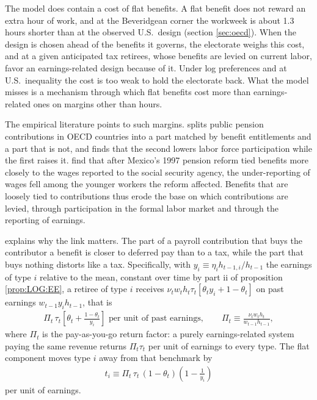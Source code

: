 The model does contain a cost of flat benefits. A flat benefit does not reward an extra hour of work, and at the Beveridgean corner the workweek is about 1.3 hours shorter than at the observed U.S.\ design (section \ref{sec:oecd}). When the design is chosen ahead of the benefits it governs, the electorate weighs this cost, and at a given anticipated tax retirees, whose benefits are levied on current labor, favor an earnings-related design because of it. Under log preferences and at U.S.\ inequality the cost is too weak to hold the electorate back. What the model misses is a mechanism through which flat benefits cost more than earnings-related ones on margins other than hours.

The empirical literature points to such margins. \textcite{Disney04a1} splits public pension contributions in OECD countries into a part matched by benefit entitlements and a part that is not, and finds that the second lowers labor force participation while the first raises it. \textcite{KumlerVF20a1} find that after Mexico's 1997 pension reform tied benefits more closely to the wages reported to the social security agency, the under-reporting of wages fell among the younger workers the reform affected. Benefits that are loosely tied to contributions thus erode the base on which contributions are levied, through participation in the formal labor market and through the reporting of earnings.


\textcite{Summers89a1} explains why the link matters. The part of a payroll contribution that buys the contributor a benefit is closer to deferred pay than to a tax, while the part that buys nothing distorts like a tax. Specifically, with $y_i \equiv \eta_i h_{t-1,i}/h_{t-1}$ the earnings of type $i$ relative to the mean, constant over time by part ii of proposition \ref{prop:LOG:EE}, a retiree of type $i$ receives $\nu_t w_t h_t\tau_t\left[\theta_t y_i + 1-\theta_t\right]$ on past earnings $w_{t-1}y_i h_{t-1}$, that is
\begin{align*}
    \Pi_t\,\tau_t\left[\theta_t + \frac{1-\theta_t}{y_i}\right] \text{ per unit of past earnings}, \qquad \Pi_t \equiv \frac{\nu_t w_t h_t}{w_{t-1}h_{t-1}},
\end{align*}
where $\Pi_t$ is the pay-as-you-go return factor: a purely earnings-related system paying the same revenue returns $\Pi_t\tau_t$ per unit of earnings to every type. The flat component moves type $i$ away from that benchmark by
\begin{align}\label{eq:esc:implicitTax}
    t_i \equiv \Pi_t\,\tau_t\,(1-\theta_t)\left(1-\frac{1}{y_i}\right)
\end{align}
per unit of earnings. 

